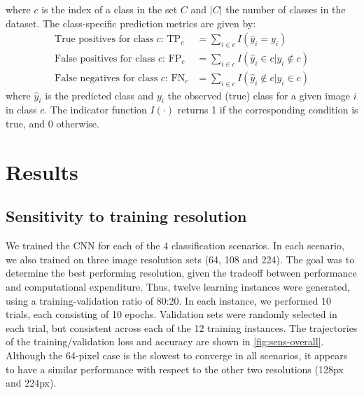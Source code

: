 \documentclass[Journal,letterpaper, SingleSpace, InsideFigs]{ascelike-new}
\begin{document}
where $c$ is the index of a class in the set $C$ and $|C|$ the number of classes in the dataset. 
The class-specific prediction metrics are given by:
\begin{align}
    \text{True positives for class $c$: } \mathrm{TP}_c &= \sum_{i \in c} I(\hat{y}_i = y_i ) \\
    \text{False positives for class $c$: } \mathrm{FP}_c &= \sum_{i \in c} I(\hat{y}_i \in c | y_i \notin c) \\
    \text{False negatives for class $c$: } \mathrm{FN}_c &= \sum_{i \in c} I(\hat{y}_i \notin c | y_i \in c)
\end{align}
where $\hat y_i$ is the predicted class and $y_i$ the observed (true) class for a given image $i$ in class $c$. The indicator function $I(\cdot)$ returns 1 if the corresponding condition is true, and 0 otherwise.

\section{Results}
\subsection{Sensitivity to training resolution}
We trained the CNN for each of the 4 classification scenarios. In each scenario, we also trained on three image resolution sets (64, 108 and 224). The goal was to determine the best performing resolution, given the tradeoff between performance and computational expenditure. Thus, twelve learning instances were generated, using a training-validation ratio of 80:20. In each instance, we performed 10 trials, each consisting of 10 epochs. Validation sets were randomly selected in each trial, but consistent across each of the 12 training instances. The trajectories of the training/validation loss and accuracy are shown in \autoref{fig:sens-overall}. Although the 64-pixel case is the slowest to converge in all scenarios, it appears to have a similar performance with respect to the other two resolutions (128px and 224px).
\end{document}
